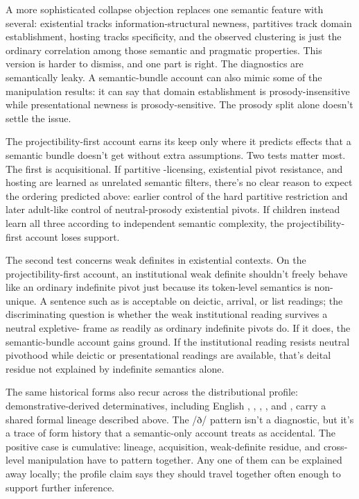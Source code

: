 \documentclass[12pt,letterpaper]{article}
\begin{document}
A more sophisticated collapse objection replaces one semantic feature with several: existential  tracks information-structural newness, partitives track domain establishment, hosting tracks specificity, and the observed clustering is just the ordinary correlation among those semantic and pragmatic properties. This version is harder to dismiss, and one part is right. The diagnostics are semantically leaky. A semantic-bundle account can also mimic some of the manipulation results: it can say that domain establishment is prosody-insensitive while presentational newness is prosody-sensitive. The prosody split alone doesn't settle the issue.

The projectibility-first account earns its keep only where it predicts effects that a semantic bundle doesn't get without extra assumptions. Two tests matter most. The first is acquisitional. If partitive -licensing, existential pivot resistance, and hosting are learned as unrelated semantic filters, there's no clear reason to expect the ordering predicted above: earlier control of the hard partitive restriction and later adult-like control of neutral-prosody existential pivots. If children instead learn all three according to independent semantic complexity, the projectibility-first account loses support.

The second test concerns weak definites in existential contexts. On the projectibility-first account, an institutional weak definite shouldn't freely behave like an ordinary indefinite pivot just because its token-level semantics is non-unique. A sentence such as  is acceptable on deictic, arrival, or list readings; the discriminating question is whether the weak institutional reading survives a neutral expletive- frame as readily as ordinary indefinite pivots do. If it does, the semantic-bundle account gains ground. If the institutional reading resists neutral pivothood while deictic or presentational readings are available, that's deital residue not explained by indefinite semantics alone.

The same historical forms also recur across the distributional profile: demonstrative-derived determinatives, including English , , , , and , carry a shared formal lineage described above. The /ð/ pattern isn't a diagnostic, but it's a trace of form history that a semantic-only account treats as accidental. The positive case is cumulative: lineage, acquisition, weak-definite residue, and cross-level manipulation have to pattern together. Any one of them can be explained away locally; the profile claim says they should travel together often enough to support further inference.
\end{document}
